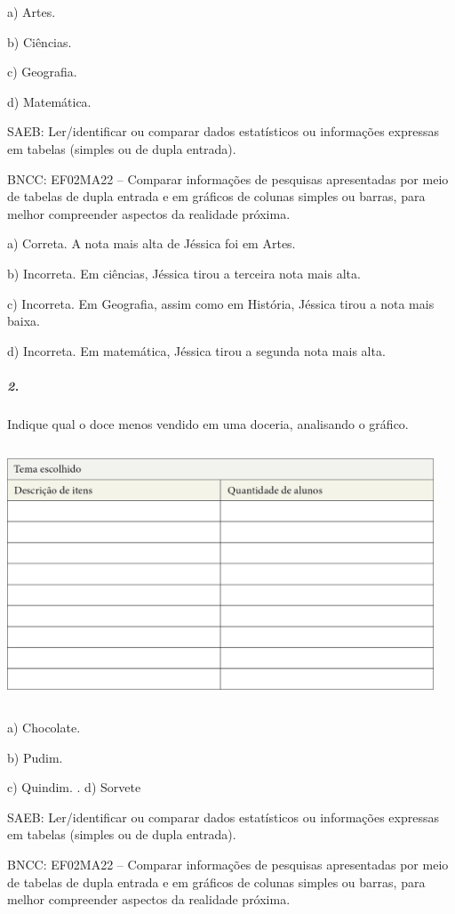 a) Artes.

b) Ciências.

c) Geografia.

d) Matemática.

SAEB: Ler/identificar ou comparar dados estatísticos ou
informações expressas em tabelas (simples ou de dupla entrada).

BNCC: EF02MA22 -- Comparar informações de pesquisas apresentadas por meio
de tabelas de dupla entrada e em gráficos de colunas simples ou barras, para melhor
compreender aspectos da realidade próxima.

a) Correta. A nota mais alta de Jéssica foi em Artes.

b) Incorreta. Em ciências, Jéssica tirou a terceira nota mais alta.

c) Incorreta. Em Geografia, assim como em História, Jéssica tirou a nota mais baixa.

d) Incorreta. Em matemática, Jéssica tirou a segunda nota mais alta.

\subparagraph{2. }\label{section-87}

Indique qual o doce menos vendido em uma doceria, analisando o gráfico.

\includegraphics[width=5.00000in,height=3.01042in]{media/image98.png}

a) Chocolate.

b) Pudim.

c) Quindim.
.
d) Sorvete

SAEB: Ler/identificar ou comparar dados estatísticos ou
informações expressas em tabelas (simples ou de dupla entrada).

BNCC: EF02MA22 -- Comparar informações de pesquisas apresentadas por meio
de tabelas de dupla entrada e em gráficos de colunas simples ou barras, para melhor
compreender aspectos da realidade próxima.


